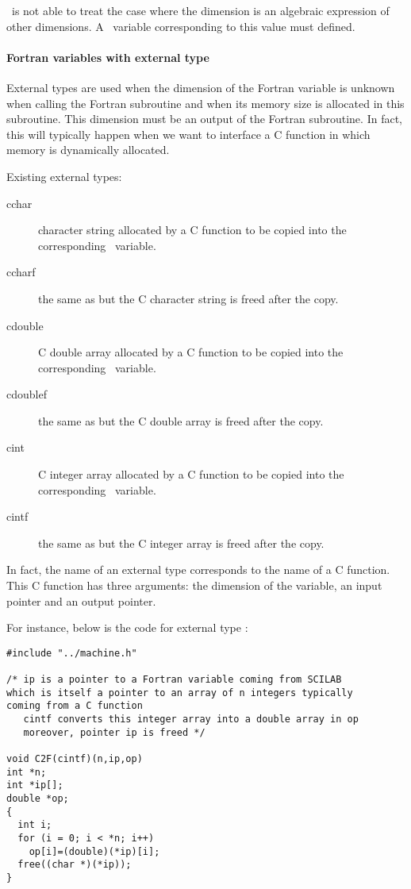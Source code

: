 \ISCI\ is not able to treat the case where the dimension is an algebraic
expression of other dimensions. A \SCI\ variable corresponding to this value
must defined.

\paragraph{Fortran variables with external type}
\label{external}

External types are used when the dimension of the Fortran variable is
unknown when calling the Fortran subroutine and when its memory size is
allocated in this subroutine. This dimension must be an output of the Fortran
subroutine. In fact, this will typically happen when we want to interface a C
function in which memory is dynamically allocated.

\smallskip

Existing external types:
\begin{description}
 \item[cchar] character string allocated by a C function to be copied into the
corresponding \SCI\ variable.
 \item[ccharf] the same as  but the C character string is freed after
the copy.
 \item[cdouble] C double array allocated by a C function to be copied into the
corresponding \SCI\ variable.
 \item[cdoublef] the same as  but the C double array is freed after
the copy.
 \item[cint] C integer array allocated by a C function to be copied into the
corresponding \SCI\ variable.
 \item[cintf] the same as  but the C integer array is freed after
the copy.
\end{description}

\medskip

In fact, the name of an external type corresponds to the name of a C function.
This C function has three arguments: the dimension of the variable, an input
pointer and an output pointer.

For instance, below is the code for external type :
\begin{verbatim}
#include "../machine.h"   

/* ip is a pointer to a Fortran variable coming from SCILAB
which is itself a pointer to an array of n integers typically
coming from a C function
   cintf converts this integer array into a double array in op 
   moreover, pointer ip is freed */

void C2F(cintf)(n,ip,op)
int *n;
int *ip[];
double *op;
{
  int i;
  for (i = 0; i < *n; i++)
    op[i]=(double)(*ip)[i];
  free((char *)(*ip));
}
\end{verbatim}

